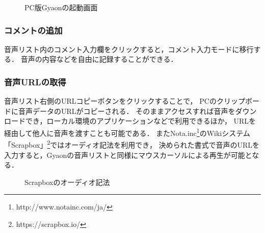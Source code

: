 \begin{figure}[H]
\centering
{}
\caption{PC版Gyaonの起動画面}
\label{gyaon}
\end{figure}

\subsubsection{コメントの追加}
音声リスト内のコメント入力欄をクリックすると，コメント入力モードに移行する．
音声の内容などを自由に記録することができる．

\subsubsection{音声URLの取得}
音声リスト右側のURLコピーボタンをクリックすることで，
PCのクリップボードに音声データのURLがコピーされる．
そのままアクセスすれば音声をダウンロードでき，ローカル環境のアプリケーションなどで利用できるほか，
URLを経由して他人に音声を渡すことも可能である．
またNota.inc\footnote{\textsf{http://www.notainc.com/ja/}}のWikiシステム
「Scrapbox」\footnote{\textsf{https://scrapbox.io/}}ではオーディオ記法を利用でき，
決められた書式で音声のURLを入力すると，Gyaonの音声リストと同様にマウスカーソルによる再生が可能となる．

\begin{figure}[H]
\centering
{}
\caption{Scrapboxのオーディオ記法}
\label{scrapbox}
\end{figure}

